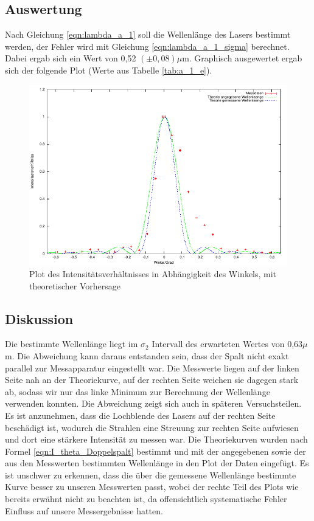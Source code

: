 \documentclass[12pt]{scrartcl}
\begin{document}
\subsection{Auswertung}
Nach Gleichung \ref{eqn:lambda_a_1} soll die Wellenlänge des Lasers bestimmt werden, der Fehler wird mit Gleichung \ref{eqn:lambda_a_1_sigma} berechnet. Dabei ergab sich ein Wert von 0,52 $(\pm 0,08) \mu$m. Graphisch ausgewertet ergab sich der folgende Plot (Werte aus Tabelle \ref{tab:a_1_e}).

\begin{figure}[H]
\centering
    \includegraphics[scale = 1]{a_1.pdf}
  	\caption[Plot des Intensitätsverhältnisses in Abhängigkeit des Winkels, mit theoretischer Vorhersage]{Plot des Intensitätsverhältnisses in Abhängigkeit des Winkels, mit theoretischer Vorhersage}
  \label{fig:a_1}
\end{figure}

\subsection{Diskussion}
Die bestimmte Wellenlänge liegt im $\sigma_2$ Intervall des erwarteten Wertes von 0,63$\mu$m. Die Abweichung kann daraus entstanden sein, dass der Spalt nicht exakt parallel zur Messapparatur eingestellt war.
Die Messwerte liegen auf der linken Seite nah an der Theoriekurve, auf der rechten Seite weichen sie dagegen stark ab, sodass wir nur das linke Minimum zur Berechnung der Wellenlänge verwenden konnten. Die Abweichung zeigt sich auch in späteren Versuchsteilen. Es ist anzunehmen, dass die Lochblende des Lasers auf der rechten Seite beschädigt ist, wodurch die Strahlen eine Streuung zur rechten Seite aufwiesen und dort eine stärkere Intensität zu messen war.
Die Theoriekurven wurden nach Formel \ref{eqn:I_theta_Doppelspalt} bestimmt und mit der angegebenen sowie der aus den Messwerten bestimmten Wellenlänge in den Plot der Daten eingefügt. Es ist unschwer zu erkennen, dass die über die gemessene Wellenlänge bestimmte Kurve besser zu unseren Messwerten passt, wobei der rechte Teil des Plots wie bereits erwähnt nicht zu beachten ist, da offensichtlich  systematische Fehler Einfluss auf unsere Messergebnisse hatten.
\end{document}
